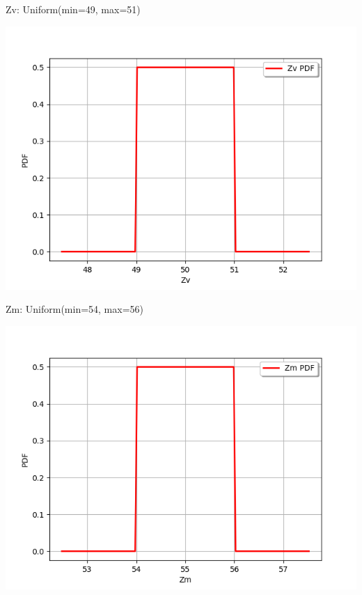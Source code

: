\documentclass{beamer}
\begin{document}
\begin{frame}[containsverbatim]
\begin{minipage}[t]{0.5\textwidth}
\begin{lstlisting}[language=Python]
\end{lstlisting}

\end{minipage}
\begin{minipage}[t]{0.5\textwidth}

Zv: Uniform(min=49, max=51)

    \includegraphics[width=.45\textwidth]{figures/Zv.png}
    
\end{minipage}%
\begin{minipage}[t]{0.5\textwidth}

Zm: Uniform(min=54, max=56)

    \includegraphics[width=.45\textwidth]{figures/Zm.png}
    
\end{minipage}%

\end{frame}


\end{document}
